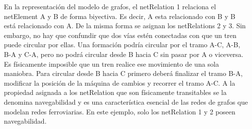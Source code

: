     En la representación del modelo de grafos, el netRelation 1 relaciona el netElement A y B de forma biyectiva. Es decir, A esta relacionado con B y B está relacionado con A. De la misma forma se asignan los netRelations 2 y 3. Sin embargo, no hay que confundir que dos vías estén conectadas con que un tren puede circular por ellas. Una formación podría circular por el tramo A-C, A-B, B-A y C-A, pero no podrá circular desde B hacia C sin pasar por A o viceversa. Es físicamente imposible que un tren realice ese movimiento de una sola maniobra. Para circular desde B hacia C primero deberá finalizar el tramo B-A, modificar la posición de la máquina de cambios y recorrer el tramo A-C. A la propiedad asignada a los netRelation que son físicamente transitables se la denomina navegabilidad y es una característica esencial de las redes de grafos que modelan redes ferroviarias. En este ejemplo, solo los netRelation 1 y 2 poseen navegabilidad.